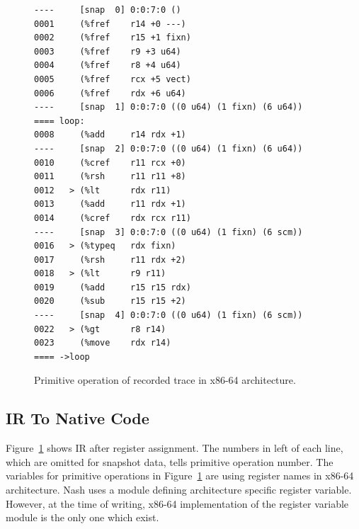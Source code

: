 \documentclass[preprint, numbers]{sigplanconf}
\begin{document}
\begin{figure}
\begin{verbatim}
----     [snap  0] 0:0:7:0 ()
0001     (%fref    r14 +0 ---)
0002     (%fref    r15 +1 fixn)
0003     (%fref    r9 +3 u64)
0004     (%fref    r8 +4 u64)
0005     (%fref    rcx +5 vect)
0006     (%fref    rdx +6 u64)
----     [snap  1] 0:0:7:0 ((0 u64) (1 fixn) (6 u64))
==== loop:
0008     (%add     r14 rdx +1)
----     [snap  2] 0:0:7:0 ((0 u64) (1 fixn) (6 u64))
0010     (%cref    r11 rcx +0)
0011     (%rsh     r11 r11 +8)
0012   > (%lt      rdx r11)
0013     (%add     r11 rdx +1)
0014     (%cref    rdx rcx r11)
----     [snap  3] 0:0:7:0 ((0 u64) (1 fixn) (6 scm))
0016   > (%typeq   rdx fixn)
0017     (%rsh     r11 rdx +2)
0018   > (%lt      r9 r11)
0019     (%add     r15 r15 rdx)
0020     (%sub     r15 r15 +2)
----     [snap  4] 0:0:7:0 ((0 u64) (1 fixn) (6 scm))
0022   > (%gt      r8 r14)
0023     (%move    rdx r14)
==== ->loop
\end{verbatim}
\caption{Primitive operation of recorded trace in x86-64 architecture.}
\label{fig:primops}
\end{figure}

\subsection{IR To Native Code}
Figure~\hyperref[fig:primops]{\ref{fig:primops}} shows IR after register
assignment. The numbers in left of each line, which are omitted for snapshot
data, tells primitive operation number. The variables for primitive operations
in Figure~\hyperref[fig:primops]{\ref{fig:primops}} are using register names
in x86-64 architecture. Nash uses a module defining architecture specific
register variable. However, at the time of writing, x86-64 implementation of
the register variable module is the only one which exist.
\end{document}
